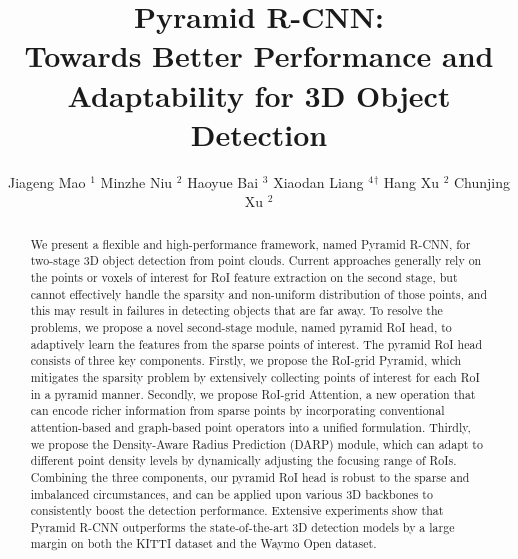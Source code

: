 \documentclass[10pt,twocolumn,letterpaper]{article}
\begin{document}
\title{Pyramid R-CNN:\\ Towards Better Performance and Adaptability for 3D Object Detection}

\author{Jiageng Mao $^1$
\hspace{2mm}
Minzhe Niu $^2$
\hspace{2mm}
Haoyue Bai $^3$
\hspace{2mm}
Xiaodan Liang $^4$$^{\dag}$
\hspace{2mm}
Hang Xu $^2$
\hspace{2mm}
Chunjing Xu $^2$
}

\maketitle
\ificcvfinal\thispagestyle{empty}\fi

\begin{abstract}
We present a flexible and high-performance framework, named Pyramid R-CNN, for two-stage 3D object detection from point clouds. Current approaches generally rely on the points or voxels of interest for RoI feature extraction on the second stage, but cannot effectively handle the sparsity and non-uniform distribution of those points, and this may result in failures in detecting objects that are far away. To resolve the problems, we propose a novel second-stage module, named pyramid RoI head, to adaptively learn the features from the sparse points of interest. The pyramid RoI head consists of three key components. Firstly, we propose the RoI-grid Pyramid, which mitigates the sparsity problem by extensively collecting points of interest for each RoI in a pyramid manner. Secondly, we propose RoI-grid Attention, a new operation that can encode richer information from sparse points by incorporating conventional attention-based and graph-based point operators into a unified formulation. Thirdly, we propose the Density-Aware Radius Prediction (DARP) module, which can adapt to different point density levels by dynamically adjusting the focusing range of RoIs. Combining the three components, our pyramid RoI head is robust to the sparse and imbalanced circumstances, and can be applied upon various 3D backbones to consistently boost the detection performance. Extensive experiments show that Pyramid R-CNN outperforms the state-of-the-art 3D detection models by a large margin on both the KITTI dataset and the Waymo Open dataset.
\end{abstract}

\let\thefootnote\relax{}
\end{document}
